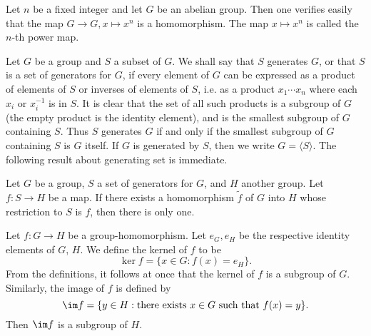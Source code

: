 \begin{example}
Let $n$ be a fixed integer and let $G$ be an abelian group. Then one verifies easily that the map $G\to G,x\mapsto x^n$ is a homomorphism. The map $x\mapsto x^n$ is called the $n$-th power map.
\end{example}
Let $G$ be a group and $S$ a subset of $G$. We shall say that $S$ generates $G$, or that $S$ is a set of generators for $G$, if every element of $G$ can be expressed as a product of elements of $S$ or inverses of elements of $S$, i.e. as a product $x_1\cdots x_n$
where each $x_i$ or $x_i^{-1}$ is in $S$. It is clear that the set of all such products is a subgroup of $G$ (the empty product is the identity element), and is the smallest subgroup of $G$ containing $S$. Thus $S$ generates $G$ if and only if the smallest subgroup of $G$ containing $S$ is $G$ itself. If $G$ is generated by $S$, then we write $G=\langle S\rangle$. The following result about generating set is immediate.
\begin{proposition}
Let $G$ be a group, $S$ a set of generators for $G$, and $H$ another group. Let $f:S\to H$ be a map. If there exists a homomorphism $\widetilde{f}$ of $G$ into $H$ whose restriction to $S$ is $f$, then there is only one.
\end{proposition}
Let $f:G\to H$ be a group-homomorphism. Let $e_G,e_H$ be the respective identity elements of $G$, $H$. We define the kernel of $f$ to be
\[\ker f=\{x\in G:f(x)=e_H\}.\]
From the definitions, it follows at once that the kernel of $f$ is a subgroup of $G$. Similarly, the image of $f$ is defined by
\[\im f=\{y\in H:\text{there exists $x\in G$ such that $f(x)=y$}\}.\]
Then $\im f$ is a subgroup of $H$.
